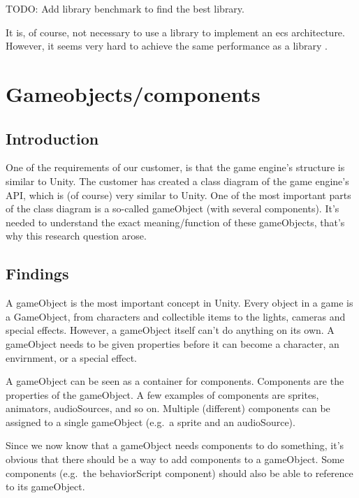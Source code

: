 \documentclass{projdoc}
\begin{document}
TODO: Add library benchmark to find the best library.

It is, of course, not necessary to use a library to implement an \gls{ecs}
architecture. However, it seems very hard to achieve the same performance as a
library \autocite{github:ecsfaq}.


\section{Gameobjects/components}
\label{sec:gameobjects-components}

\subsection{Introduction}

One of the requirements of our customer, is that the game engine's structure is
similar to Unity. The customer has created a class diagram of the game engine's API,
which is (of course) very similar to Unity. One of the most important parts of the
class diagram is a so-called gameObject (with several components). It's needed to
understand the exact meaning/function of these gameObjects, that's why this research
question arose.

\subsection{Findings}

A gameObject is the most important concept in Unity. Every object in a game is a
GameObject, from characters and collectible items to the lights, cameras and special
effects. However, a gameObject itself can't do anything on its own. A gameObject
needs to be given properties before it can become a character, an envirnment, or a
special effect. \autocite{man:unityGameobjects}

A gameObject can be seen as a container for components. Components are the properties
of the gameObject. A few examples of components are sprites, animators, audioSources,
and so on. Multiple (different) components can be assigned to a single gameObject
(e.g.~a sprite and an audioSource).

Since we now know that a gameObject needs components to do something, it's obvious
that there should be a way to add components to a gameObject. Some components
(e.g.~the behaviorScript component) should also be able to reference to its
gameObject.
\end{document}

